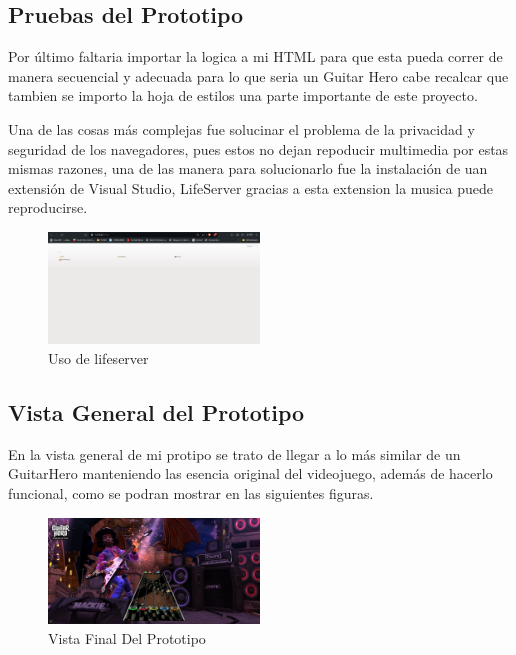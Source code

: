 \documentclass[conference]{IEEEtran}
\begin{document}
\subsection{Pruebas del Prototipo}

Por último faltaria importar la logica a mi HTML para que esta pueda correr de manera secuencial y adecuada para lo que seria un Guitar Hero cabe recalcar que tambien se importo la hoja de estilos una parte importante de este proyecto.

Una de las cosas más complejas fue solucinar el problema de la privacidad y seguridad de los navegadores, pues estos no dejan repoducir multimedia por estas mismas razones, una de las manera para solucionarlo fue la instalación de uan extensión de Visual Studio, LifeServer gracias a esta extension la musica puede reproducirse.

\begin{figure}[h] %
    \centering
    \includegraphics[width=0.5\textwidth]{Life server.png} %
    \caption{Uso de lifeserver}
    \label{fig:mi_imagen}
\end{figure}

\subsection{Vista General del Prototipo}
En la vista general de mi protipo se trato de llegar a lo más similar de un GuitarHero manteniendo las esencia original del videojuego, además de hacerlo funcional, como se podran mostrar en las siguientes figuras.

\begin{figure}[h] %
    \centering
    \includegraphics[width=0.5\textwidth]{GuitarHeroView.png} %
    \caption{Vista Final Del Prototipo}
    \label{fig:mi_imagen}
\end{figure}
\end{document}
